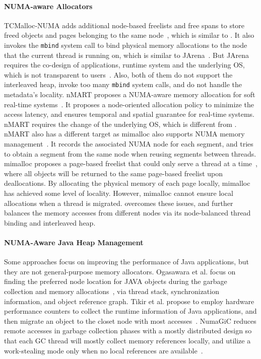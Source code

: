 \paragraph{NUMA-aware Allocators} TCMalloc-NUMA adds additional node-based freelists and free spans to store freed objects and pages belonging to the same node~\cite{tcmallocnuma}, which is similar to \NM{}. It also invokes the \texttt{mbind} system call to bind physical memory allocations to the node that the current thread is running on, which is similar to JArena~\cite{yang2019jarena}. But JArena requires the co-design of applications, runtime system and the underlying OS, which is not transparent to users~\cite{yang2019jarena}. Also, both of them do not support the interleaved heap, invoke too many \texttt{mbind} system calls, and do not handle the metadata's locality. nMART proposes a NUMA-aware memory allocation for soft real-time systems~\cite{kim2013node}. It proposes a node-oriented allocation policy to minimize the access latency, and ensures temporal and spatial guarantee for real-time systems. nMART requires the change of the underlying OS, which is different from \NM{}. nMART also has a different target as 
mimalloc also supports NUMA memory management~\cite{mimalloc}. It records the associated NUMA node for each segment, and tries to obtain a segment from the same node when reusing segments between threads. mimalloc proposes a page-based freelist that could only serve a thread at a time~\cite{mimalloc}, where all objects will be returned to the same page-based freelist upon deallocations. By allocating the physical memory of each page locally, mimalloc has achieved some level of locality. However, mimalloc cannot ensure local allocations when a thread is migrated. \NM{} overcomes these issues, and further balances the memory accesses from different nodes via its node-balanced thread binding and interleaved heap. 


\paragraph{NUMA-Aware Java Heap Management} Some approaches focus on improving the performance of Java applications, but they are not general-purpose memory allocators. Ogasawara et al. focus on finding the preferred node location for JAVA objects during the garbage collection and memory allocations~\cite{Ogasawara}, via thread stack, synchronization information, and object reference graph. Tikir et al. propose to employ hardware performance counters to collect the runtime information of Java applications, and then migrate an object to the closet node with most accesses~\cite{1419934}. 
NumaGiC reduces remote accesses in garbage collection phases with a mostly distributed design so that each GC thread will mostly collect memory references locally, and utilize a work-stealing mode only when no local references are available~\cite{NumaGiC}.



